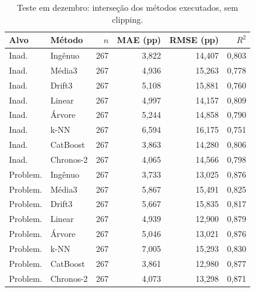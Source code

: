 \begin{table}[ht]
\centering
\caption{Teste em dezembro: interseção dos métodos executados, sem clipping.}
\label{tab:results}
\small
\begin{tabular}{llrrrr}
\hline
Alvo & Método & $n$ & MAE (pp) & RMSE (pp) & $R^2$ \\
\hline
Inad. & Ingênuo & 267 & 3,822 & 14,407 & 0,803 \\
Inad. & Média3 & 267 & 4,936 & 15,263 & 0,778 \\
Inad. & Drift3 & 267 & 5,108 & 15,881 & 0,760 \\
Inad. & Linear & 267 & 4,997 & 14,157 & 0,809 \\
Inad. & Árvore & 267 & 5,244 & 14,858 & 0,790 \\
Inad. & k-NN & 267 & 6,594 & 16,175 & 0,751 \\
Inad. & CatBoost & 267 & 3,863 & 14,280 & 0,806 \\
Inad. & Chronos-2 & 267 & 4,065 & 14,566 & 0,798 \\
Problem. & Ingênuo & 267 & 3,733 & 13,025 & 0,876 \\
Problem. & Média3 & 267 & 5,867 & 15,491 & 0,825 \\
Problem. & Drift3 & 267 & 5,667 & 15,835 & 0,817 \\
Problem. & Linear & 267 & 4,939 & 12,900 & 0,879 \\
Problem. & Árvore & 267 & 5,046 & 13,021 & 0,876 \\
Problem. & k-NN & 267 & 7,005 & 15,293 & 0,830 \\
Problem. & CatBoost & 267 & 3,861 & 12,980 & 0,877 \\
Problem. & Chronos-2 & 267 & 4,073 & 13,298 & 0,871 \\
\hline
\end{tabular}
\end{table}